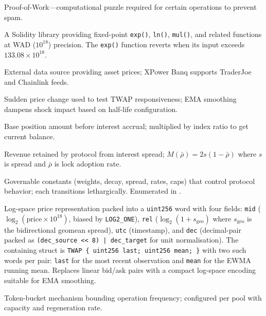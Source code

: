 \documentclass[10pt,a4paper,twocolumn]{article}
\begin{document}
\begin{description}[style=nextline, leftmargin=2.5em, labelindent=0em, font=\normalfont\bfseries]
\item[PoW] Proof-of-Work---computational puzzle required for certain operations to prevent spam.

\item[PRBMath] A Solidity library providing fixed-point \texttt{exp()}, \texttt{ln()}, \texttt{mul()}, and related functions at WAD ($10^{18}$) precision. The \texttt{exp()} function reverts when its input exceeds $133.08 \times 10^{18}$.

\item[Price Feed] External data source providing asset prices; XPower Banq supports TraderJoe and Chainlink feeds.

\item[Price Shock] Sudden price change used to test TWAP responsiveness; EMA smoothing dampens shock impact based on half-life configuration.

\item[Principal] Base position amount before interest accrual; multiplied by index ratio to get current balance.

\item[Protocol Margin] Revenue retained by protocol from interest spread; $M(\bar{\rho}) = 2s(1-\bar{\rho})$ where $s$ is spread and $\bar{\rho}$ is lock adoption rate.

\item[Protocol Parameters] Governable constants (weights, decay, spread, rates, caps) that control protocol behavior; each transitions lethargically. Enumerated in \cite[\S A]{wp}.


\item[Quote / TWAP packed word] Log-space price representation packed into a \texttt{uint256} word with four fields: \texttt{mid} ($\log_2(\text{price} \times 10^{18})$, biased by \texttt{LOG2\_ONE}), \texttt{rel} ($\log_2(1 + s_{\text{geo}})$ where $s_{\text{geo}}$ is the bidirectional geomean spread), \texttt{utc} (timestamp), and \texttt{dec} (decimal-pair packed as \texttt{(dec\_source << 8) | dec\_target} for unit normalisation). The containing struct is \texttt{TWAP \{ uint256 last; uint256 mean; \}} with two such words per pair: \texttt{last} for the most recent observation and \texttt{mean} for the EWMA running mean. Replaces linear bid/ask pairs with a compact log-space encoding suitable for EMA smoothing.


\item[Rate Limit] Token-bucket mechanism bounding operation frequency; configured per pool with capacity and regeneration rate.


\end{description}
\end{document}
